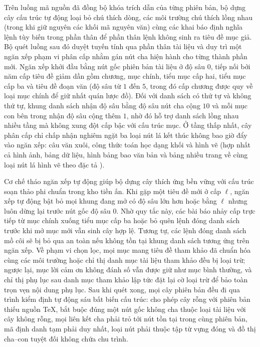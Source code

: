 Trên luồng mã nguồn đã đồng bộ khóa trích dẫn của từng phiên bản, bộ dựng cây cấu trúc tự động loại bỏ chú thích dòng, các môi trường chú thích lồng nhau (trong khi giữ nguyên các khối mã nguyên văn) cùng các khai báo định nghĩa lệnh tùy biến trong phần thân để phần thân lệnh không sinh ra tiêu đề mục giả. Bộ quét luồng sau đó duyệt tuyến tính qua phần thân tài liệu và duy trì một ngăn xếp phạm vi phân cấp nhằm gán nút cha hiện hành cho từng thành phần mới. Ngăn xếp khởi đầu bằng nút gốc phiên bản tài liệu ở độ sâu $0$, tiếp nối bởi năm cấp tiêu đề giảm dần gồm chương, mục chính, tiểu mục cấp hai, tiểu mục cấp ba và tiêu đề đoạn văn (độ sâu từ $1$ đến $5$, trong đó cấp chương được quy về loại mục chính để giữ nhất quán lược đồ). Đối với danh sách có thứ tự và không thứ tự, khung danh sách nhận độ sâu bằng độ sâu nút cha cộng $10$ và mỗi mục con bên trong nhận độ sâu cộng thêm $1$, nhờ đó hỗ trợ danh sách lồng nhau nhiều tầng mà không xung đột cấp bậc với cấu trúc mục. Ở tầng thấp nhất, cây phân cấp chỉ chấp nhận nghiêm ngặt ba loại nút lá kết thúc không bao giờ đẩy vào ngăn xếp: câu văn xuôi, công thức toán học dạng khối và hình vẽ (hợp nhất cả hình ảnh, bảng dữ liệu, hình bảng bao văn bản và bảng nhiều trang về cùng loại nút lá hình vẽ theo đặc tả \cite{hcmus_intro_ds}).

Cơ chế tháo ngăn xếp tự động giúp bộ dựng cây thích ứng bền vững với cấu trúc soạn thảo phi chuẩn trong kho tiền ấn. Khi gặp một tiêu đề mới ở cấp $\ell$, ngăn xếp tự động bật bỏ mọi khung đang mở có độ sâu lớn hơn hoặc bằng $\ell$ nhưng luôn dừng lại trước nút gốc độ sâu $0$. Nhờ quy tắc này, các bài báo nhảy cấp trực tiếp từ mục chính xuống tiểu mục cấp ba hoặc bỏ quên lệnh đóng danh sách trước khi mở mục mới vẫn sinh cây hợp lệ. Tương tự, các lệnh đóng danh sách mồ côi sẽ bị bỏ qua an toàn nếu không tồn tại khung danh sách tương ứng trên ngăn xếp. Về phạm vi chọn lọc, mọi mục mang tiêu đề tham khảo đã chuẩn hóa cùng các môi trường hoặc chỉ thị danh mục tài liệu tham khảo đều bị loại trừ; ngược lại, mục lời cảm ơn không đánh số vẫn được giữ như mục bình thường, và chỉ thị phụ lục sau danh mục tham khảo lập tức đặt lại cờ loại trừ để bảo toàn trọn vẹn nội dung phụ lục. Sau khi quét xong, mọi cây phiên bản đều đi qua trình kiểm định tự động sáu bất biến cấu trúc: cho phép cây rỗng với phiên bản thiếu nguồn TeX, bắt buộc đúng một nút gốc không cha thuộc loại tài liệu với cây không rỗng, mọi liên kết cha phải trỏ tới nút tồn tại trong cùng phiên bản, mã định danh tạm phải duy nhất, loại nút phải thuộc tập từ vựng đóng và đồ thị cha--con tuyệt đối không chứa chu trình.

